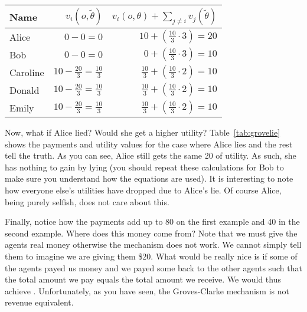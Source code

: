 \begin{SCtable}
  \begin{minipage}{1.0\linewidth}
    \begin{center}
      \renewcommand\arraystretch{1.5}
      \begin{tabular}{lrr}\toprule
        Name & $v_i(o, \tilde{\theta})$ &$v_i(o, \theta) +  \sum_{j \neq i} v_j(\tilde{\theta})$
        \\ \midrule
        Alice 
        &$0 - 0 = 0$
        &$10 +  (\frac{10}{3} \cdot 3) = 20$
        \\ 
        
        Bob  
        &$0 - 0 = 0$
        &$0 +  (\frac{10}{3} \cdot 3) = 10$  
        \\ 
        
        Caroline  
        &$10 - \frac{20}{3} = \frac{10}{3}$
        &$\frac{10}{3} +  (\frac{10}{3}\cdot 2) = 10$
        \\ 
        
        Donald  
        &$10 - \frac{20}{3}  = \frac{10}{3}$
        &$\frac{10}{3} +  (\frac{10}{3}\cdot 2) = 10$
        \\ 
        
        Emily  
        &$10 - \frac{20}{3} = \frac{10}{3}$
        &$\frac{10}{3} +  (\frac{10}{3}\cdot 2) = 10$
        \\ \bottomrule
      \end{tabular}
    \end{center}
  \end{minipage}
  \caption{Groves-Clarke payments for house painting assuming that
    Alice lies and all others tell the truth.}
  \label{tab:grovelie}
\end{SCtable}

Now, what if Alice lied? Would she get a higher utility?
Table~\ref{tab:grovelie} shows the payments and utility values for the
case where Alice lies and the rest tell the truth. As you can see,
Alice still gets the same 20 of utility. As such, she has nothing to
gain by lying (you should repeat these calculations for Bob to make
sure you understand how the equations are used). It is interesting to
note how everyone else's utilities have dropped due to Alice's lie. Of
course Alice, being purely selfish, does not care about this.

Finally, notice how the payments add up to 80 on the first example and
40 in the second example. Where does this money come from? Note that
we must give the agents real money otherwise the mechanism does not
work. We cannot simply tell them to imagine we are giving them \$20.
What would be really nice is if some of the agents payed us money and
we payed some back to the other agents such that the total amount we
pay equals the total amount we receive. We would thus achieve
. Unfortunately, as you have seen, the
Groves-Clarke mechanism is not revenue equivalent.

